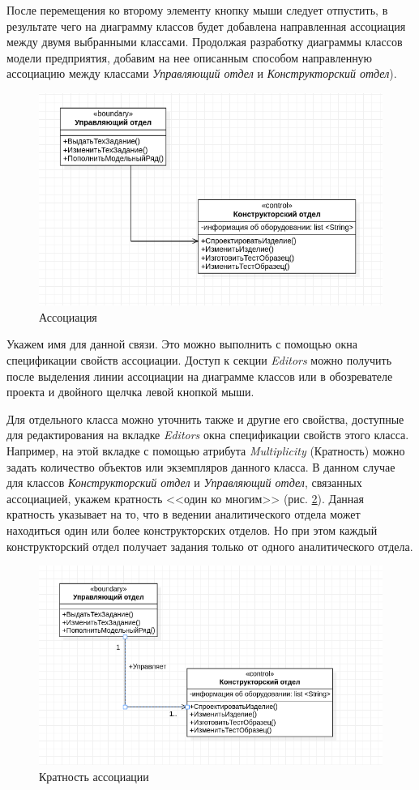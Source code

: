 \documentclass[a4paper,12pt]{report}
\begin{document}
После перемещения ко второму элементу кнопку мыши следует отпустить, в результате чего на диаграмму классов будет добавлена направленная ассоциация между двумя выбранными классами.
Продолжая разработку диаграммы классов модели предприятия, добавим на нее описанным способом направленную ассоциацию между классами \textit{Управляющий отдел} и \textit{Конструкторский отдел}).

\begin{figure}[h!]
	\centering
	\includegraphics[width=0.7\linewidth]{images/association}
	\caption{Ассоциация}
	\label{fig:association}
\end{figure}

Укажем имя для данной связи. Это можно выполнить с помощью окна спецификации свойств ассоциации. Доступ к секции \textit{Editors} можно получить после выделения линии ассоциации на диаграмме классов или в обозревателе проекта и двойного щелчка левой кнопкой мыши.

Для отдельного класса можно уточнить также и другие его свойства, доступные для редактирования на вкладке \textit{Editors} окна спецификации свойств этого класса. Например, на этой вкладке с помощью атрибута \textit{Multiplicity }(Кратность) можно задать количество объектов или экземпляров данного класса. В данном случае для классов \textit{Конструкторский отдел} и \textit{Управляющий отдел}, связанных ассоциацией, укажем кратность <<один ко многим>> (рис. \ref{fig:associationclasses}). Данная кратность указывает на то, что в ведении аналитического отдела может находиться один или более конструкторских отделов. Но при этом каждый конструкторский отдел получает задания только от одного аналитического отдела. 
\begin{figure}[h!]
	\centering
	\includegraphics[width=0.7\linewidth]{images/associationclasses}
	\caption{Кратность ассоциации}
	\label{fig:associationclasses}
\end{figure}
\end{document}
